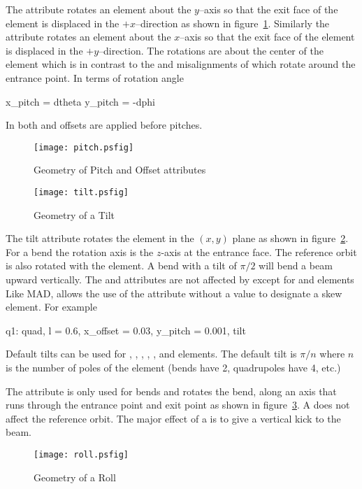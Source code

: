 The  attribute rotates an element about the $y$--axis
so that the exit face of the element is displaced in the 
$+x$--direction as shown in figure~\ref{f:pitch}. Similarly
the  attribute rotates an element about the $x$--axis
so that the exit face of the element is displaced in the 
$+y$--direction. The rotations
are about the center of the element which is in contrast to the 
 and  misalignments of \MAD which rotate
around the entrance point. In terms of rotation angle
\begin{example}
  x_pitch =  dtheta
  y_pitch = -dphi
\end{example}
In both \bmad and \mad offsets are applied before pitches.
\begin{figure}
  \centering
  \texttt{[image: pitch.psfig]}
  \caption{Geometry of Pitch and Offset attributes}
  \label{f:pitch}
\end{figure}

\begin{figure}
  \centering
  \texttt{[image: tilt.psfig]}
  \caption{Geometry of a Tilt}
  \label{f:tilt}
\end{figure}

The tilt attribute rotates the element in the $(x, y)$ plane as
shown in figure~\ref{f:tilt}. For a bend the rotation axis is the
$z$-axis at the entrance face. The reference orbit is also rotated
with the element. A bend with a tilt of $\pi/2$ will bend a beam
upward vertically. The  and  attributes are
not affected by  except for  and 
elements
Like MAD, \bmad allows the use of the  attribute without
a value to designate a skew element. For example
\begin{example}
  q1: quad, l = 0.6, x_offset = 0.03, y_pitch = 0.001, tilt
\end{example}
Default tilts can be used for , , ,
, , and  elements.
The default tilt is $\pi/n$ where $n$ is the number of poles of the
element (bends have 2, quadrupoles have 4, etc.) 


The  attribute is only used for bends
and rotates the bend, along an axis that runs through the entrance
point and exit point as shown in figure~\ref{f:roll}. A  
does not affect the reference orbit. The major effect of a 
is to give a vertical kick to the beam.
\begin{figure}
  \centering
  \texttt{[image: roll.psfig]}
  \caption{Geometry of a Roll}
  \label{f:roll}
\end{figure}


